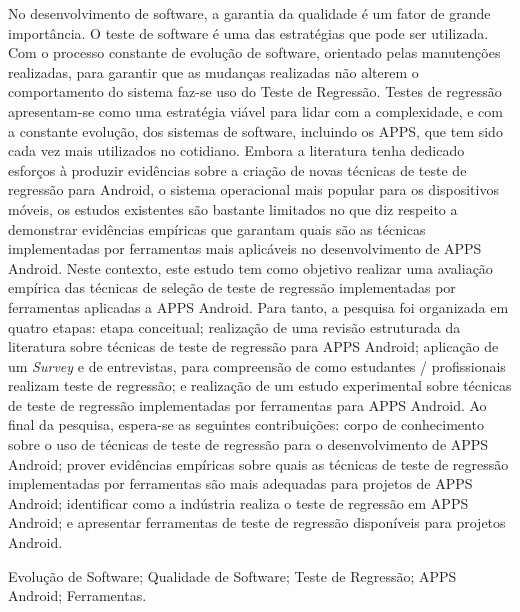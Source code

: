 
\resumo


No desenvolvimento de software, a garantia da qualidade é um fator de grande importância. O teste de software é uma das estratégias que pode ser utilizada. Com o processo constante de evolução de software, orientado pelas manutenções realizadas, para garantir que as mudanças realizadas não alterem o comportamento do sistema faz-se uso do Teste de Regressão. Testes de regressão apresentam-se como uma estratégia viável para lidar com a complexidade, e com a constante evolução, dos sistemas de software, incluindo os \ac{APPS}, que tem sido cada vez mais utilizados no cotidiano. Embora a literatura tenha dedicado esforços à produzir evidências sobre a criação de novas técnicas de teste de regressão para Android,  o sistema operacional mais popular para os dispositivos móveis, os estudos existentes são bastante limitados no que diz respeito a demonstrar evidências empíricas que garantam quais são as técnicas implementadas por ferramentas mais aplicáveis no desenvolvimento de \ac{APPS} Android. Neste contexto, este estudo tem como objetivo realizar uma avaliação empírica das técnicas de seleção de teste de regressão implementadas por ferramentas aplicadas a \ac{APPS} Android. Para tanto, a pesquisa foi organizada em quatro etapas: etapa conceitual; realização de uma revisão estruturada da literatura sobre técnicas de teste de regressão para \ac{APPS} Android; aplicação de um \textit{Survey} e de entrevistas, para compreensão de como estudantes / profissionais realizam teste de regressão; e realização de um estudo experimental sobre técnicas de teste de regressão implementadas por ferramentas para \ac{APPS} Android. Ao final da pesquisa, espera-se as seguintes contribuições: corpo de conhecimento sobre o uso de técnicas de teste de regressão para o desenvolvimento de \ac {APPS} Android; prover evidências empíricas sobre quais as técnicas de teste de regressão implementadas por ferramentas são mais adequadas para projetos de \ac{APPS} Android; identificar como a indústria realiza o teste de regressão em \ac{APPS} Android; e apresentar ferramentas de teste de regressão disponíveis para projetos Android.



\begin{keywords}
Evolução de Software; Qualidade de Software; Teste de Regressão; APPS Android; Ferramentas.
\end{keywords}

